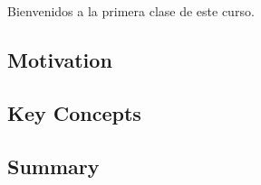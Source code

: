 
Bienvenidos a la primera clase de este curso.

\subsection{Motivation}


\subsection{Key Concepts}


\subsection{Summary}


